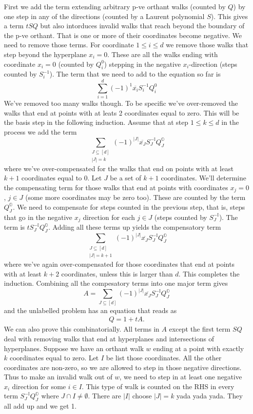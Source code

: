 \documentclass[12pt]{article}
\newcommand{\oo}{\mathbb{O}}
\newcommand{\one}{\mathbb{I}}
\theoremstyle{definition} \newtheorem{definition}[theorem]{Definition}
\newcommand{\ol}[1]{\overline{#1}}
\begin{document}
First we add the term extending arbitrary p-ve orthant walks (counted by $Q$) by one step in any of the directions (counted by a Laurent polynomial $S$). This gives a term $tSQ$ but also intorduces invalid walks that reach beyond the boundary of the p-ve orthant. That is one or more of their coordinates become negative. We need to remove those terms. For coordinate $1\leq i \leq d$ we remove those walks that step beyond the hyperplane $x_i = 0$. These are all the walks ending with coordinate $x_i = 0$ (counted by $Q_i^0$) stepping in the negative $x_i$-direction (steps counted by $S_i^{-1}$). The term that we need to add to the equation so far is
\[
	\sum_{i=1}^d (-1)^1\ol{x_i}S_i^{-1}Q_i^0
\]
We've removed too many walks though. To be specific we've over-removed the walks that end at points with at leats 2 coordinates equal to zero. This will be the basis step in the following induction. Assume that at step $1\leq k \leq d$ in the process we add the term
\[
	\sum_{\substack{J\subseteq [d]\\|J|=k}}(-1)^{|J|} \ol{x_J}S_{J}^{-\one}Q_{J}^{\oo}
\]
where we've over-compensated for the walks that end on points with at least $k+1$ coordinates equal to 0. Let $J$ be a set of $k+1$ coordinates. We'll determine the compensating term for those walks that end at points with coordinates $x_j = 0$, $j\in J$ (some more coordinates may be zero too). These are counted by the term $Q_J^\oo$. We need to compensate for steps counted in the previous step, that is, steps that go in the negative $x_j$ direction for each $j\in J$ (steps counted by $S_J^{-\one}$). The term is $tS_J^{-\one}Q_J^\oo$. Adding all these terms up yields the compensatory term
\[
	\sum_{\substack{J\subseteq [d]\\|J|=k+1}}(-1)^{|J|} \ol{x_J}S_{J}^{-\one}Q_{J}^{\oo}
\]
where we've again over-compensated for those coordinates that end at points with at least $k+2$ coordinates, unless this is larger than $d$. This completes the induction. Combining all the compesatory terms into one major term gives
\[
     A = \sum_{J\subseteq [d]}(-1)^{|J|} \ol{x_J}S_{J}^{-\one}Q_{J}^{\oo}
\]
and the unlabelled problem has an equation that reads as
\begin{align}
     Q = 1 + tA.
\end{align}
We can also prove this combinatorially. All terms in $A$ except the first term $SQ$ deal with removing walks that end at hyperplanes and intersections of hyperplanes. Suppose we have an orthant walk $w$ ending at a point with exactly $k$ coordinates equal to zero. Let $I$ be list those coordinates. All the other coordinates are non-zero, so we are allowed to step in those negative directions. Thus to make an invalid walk out of $w$, we need to step in at least one negative $x_i$ direction for some $i \in I$. This type of walk is counted on the RHS in every term $S_J^{-\one}Q_J^\oo$ where $J\cap I \neq \emptyset$. There are $|I|$ choose $|J| = k$ yada yada yada. They all add up and we get 1.
\end{document}
